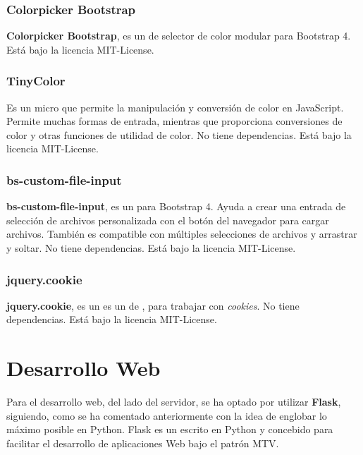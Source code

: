 \subsubsection{Colorpicker Bootstrap}

\textbf{Colorpicker Bootstrap},  es un  de selector de color modular para Bootstrap 4. Está bajo la licencia MIT-License.


\subsubsection{TinyColor}

Es un micro  que permite la manipulación y conversión de color en JavaScript. Permite muchas formas de entrada, mientras que proporciona conversiones de color y otras funciones de utilidad de color. No tiene dependencias. Está bajo la licencia MIT-License.


\subsubsection{bs-custom-file-input}

\textbf{bs-custom-file-input}, es un  para Bootstrap 4. Ayuda a crear una entrada de selección de archivos personalizada con el botón del navegador para cargar archivos. También es compatible con múltiples selecciones de archivos y arrastrar y soltar.
No tiene dependencias. Está bajo la licencia MIT-License.

\subsubsection{jquery.cookie}

\textbf{jquery.cookie}, es un es un  de  , para trabajar con \emph{cookies}.
No tiene dependencias. Está bajo la licencia MIT-License.



\section{Desarrollo Web}

Para el desarrollo web, del lado del servidor, se ha optado por utilizar \textbf{Flask}, siguiendo, como se ha comentado anteriormente con la idea de englobar lo máximo posible en Python.
Flask es un  escrito en Python y concebido para facilitar el desarrollo de aplicaciones Web bajo el patrón MTV.

